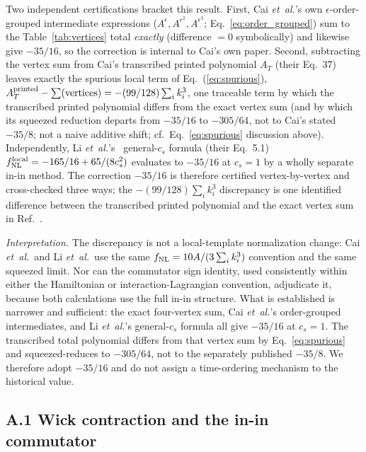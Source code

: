\documentclass[aps,prd,twocolumn,superscriptaddress,showpacs,preprintnumbers,nofootinbib,longbibliography,floatfix]{revtex4-2}
\newcommand{\fnl}{f_{\rm NL}}
\newcommand{\etal}{\textit{et~al.}}
\begin{document}
Two independent certifications bracket this result. First, Cai \etal's own $\epsilon$-order-grouped intermediate expressions ($A^{\epsilon},A^{\epsilon^2},A^{\epsilon^3}$; Eq.~\ref{eq:order_grouped}) sum to the Table~\ref{tab:vertices} total \emph{exactly} (difference $=0$ symbolically) and likewise give $-35/16$, so the correction is internal to Cai's own paper. Second, subtracting the vertex sum from Cai's transcribed printed polynomial $A_T$ (their Eq.~37) leaves exactly the spurious local term of Eq.~(\ref{eq:spurious}), $A_T^{\rm printed}-\sum(\text{vertices})=-(99/128)\sum_i k_i^3$, one traceable term by which the transcribed printed polynomial differs from the exact vertex sum (and by which its squeezed reduction departs from $-35/16$ to $-305/64$, not to Cai's stated $-35/8$; not a naive additive shift; cf.\ Eq.~\ref{eq:spurious} discussion above). Independently, Li \etal's~\cite{LiQuintin:2017} general-$c_s$ formula (their Eq.~5.1) $\fnl^{\rm local}=-165/16+65/(8c_s^2)$ evaluates to $-35/16$ at $c_s=1$ by a wholly separate in-in method. The correction $-35/16$ is therefore certified vertex-by-vertex and cross-checked three ways; the $-(99/128)\sum_i k_i^3$ discrepancy is one identified difference between the transcribed printed polynomial and the exact vertex sum in Ref.~\cite{Cai:2009fn}.

\emph{Interpretation.} The discrepancy is not a local-template normalization change: Cai \etal\ and Li \etal\ use the same $\fnl=10A/(3\sum_i k_i^3)$ convention and the same squeezed limit. Nor can the commutator sign identity, used consistently within either the Hamiltonian or interaction-Lagrangian convention, adjudicate it, because both calculations use the full in-in structure. What is established is narrower and sufficient: the exact four-vertex sum, Cai \etal's order-grouped intermediates, and Li \etal's general-$c_s$ formula all give $-35/16$ at $c_s=1$. The transcribed total polynomial differs from that vertex sum by Eq.~\eqref{eq:spurious} and squeezed-reduces to $-305/64$, not to the separately published $-35/8$. We therefore adopt $-35/16$ and do not assign a time-ordering mechanism to the historical value.

\subsection*{A.1 Wick contraction and the in-in commutator}
\label{app:wick}
\end{document}
